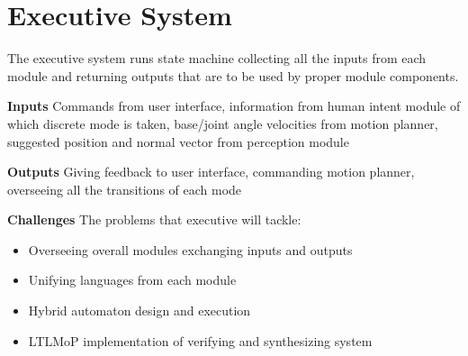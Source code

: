 \documentclass[10pt]{article}
\begin{document}
\begin{comment}
\section{Overview} \label{sec:overview}
\subsection*{Project Summary}
\par Clamps and "helping hands" are critical tools for skilled, dextrous work. They hold working items like circuit boards steady in a useful position. Wouldn't it be great if instead of painstakingly placing clamps and hoping they hold just they way you want them to, a robotic arm could take the item from you and hold it? This system would be more flexible and user friendly than a purely mechanical solution, but stronger and more tireless than a human assistant.
\par The goal of this project is to create a robotic system that:
\begin{itemize}


\item Perceives an item to be held
\item Accepts human commands to grasp, let go, etc.
\item Grasps that item while attempting to maintain the item's pose
\item Exhibits compliant behavior that allows the human to reposition the item 
\item Exhibits rigid behavior to keep the item steady during work
\end{itemize}
\end{comment}

\section*{Executive System}
The executive system runs state machine collecting all the inputs from each module and returning outputs that are to be used by proper module components.
\\
\par \textbf{Inputs} Commands from user interface, information from human intent module of which discrete mode is taken, base/joint angle velocities from motion planner, suggested position and normal vector from perception module
\\
\par \textbf{Outputs} Giving feedback to user interface, commanding motion planner, overseeing all the transitions of each mode
\\
\par \textbf{Challenges} The problems that executive will tackle:
\begin{itemize}
\item Overseeing overall modules exchanging inputs and outputs
\item Unifying languages from each module
\item Hybrid automaton design and execution
\item LTLMoP implementation of verifying and synthesizing system
\\
\end{itemize}
\end{document}
